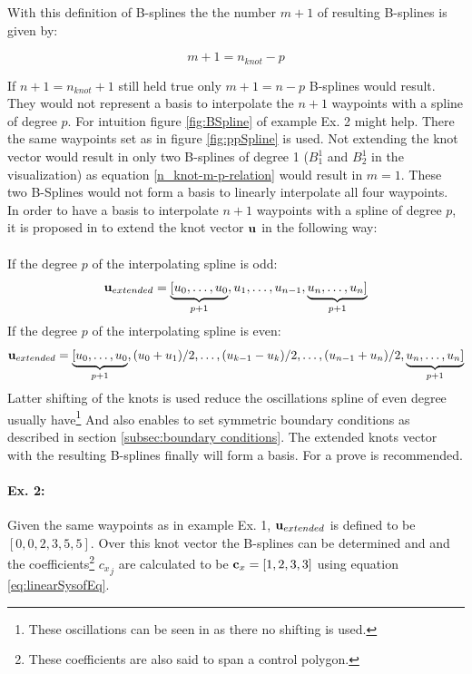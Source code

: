 With this definition of B-splines the the number $m+1$ of resulting B-splines is given by:
 
\begin{equation}
\label{n_knot-m-p-relation}
m+1=n_{knot}-p
\end{equation} 

If $n+1=n_{knot}+1$ still held true only $m+1=n-p$ B-splines would result. They would not represent a basis to interpolate the $n+1$ waypoints with a spline of degree $p$. For intuition figure \ref{fig:BSpline} of example  Ex. 2 might help. There the same waypoints set as in figure \ref{fig:ppSpline} is used. Not extending the knot vector would result in only two B-splines of degree 1 ($B_1^1$ and $B_2^1$ in the visualization) as equation \eqref{n_knot-m-p-relation} would result in $m=1$. These two B-Splines would not form a basis to linearly interpolate all four waypoints. \\
In order to have a basis to interpolate $n+1$ waypoints with a spline of degree $p$, it is proposed in \cite{biagiotti} to extend the knot vector ${\bf u}$ in the following way:\\
\\
If the degree $p$ of the interpolating spline is odd:
\begin{equation}
{\bf u}_{extended}= \underbrace{ [u_0,\ldots,u_0}_{p+1},u_1, \ldots,u_{n-1},\underbrace{u_n,\ldots, u_n ]}_{p+1} 
\end{equation}
If the degree $p$ of the interpolating spline is even:
\begin{equation}
{\bf u}_{extended}= \underbrace{ [u_0,\ldots,u_0}_{p+1},(u_0+u_1)/2, \ldots, (u_{k-1}-u_k)/2, \ldots,(u_{n-1}+u_n)/2,\underbrace{u_n,\ldots, u_n ]}_{p+1} 
\end{equation} 
Latter shifting of the knots is used reduce the oscillations spline of even degree usually have\footnote{These oscillations can be seen in \cite{doessegger} as there no shifting is used.} And also enables to set symmetric boundary conditions as described in section \ref{subsec:boundary conditions}. The extended knots vector with the resulting B-splines finally will form a basis. For a prove \cite{dahmen} is recommended.

\paragraph{Ex. 2:}
Given the same waypoints as in example Ex. 1, ${\bf u}_{extended}$ is defined to be $[0,0,2,3,5,5]$. Over this knot vector the B-splines can be determined and and the coefficients\footnote{These coefficients are also said to span a control polygon.} ${c_x}_j$ are calculated to be ${\bf c}_x=[1,2,3,3]$ using equation \eqref{eq:linearSysofEq}.


